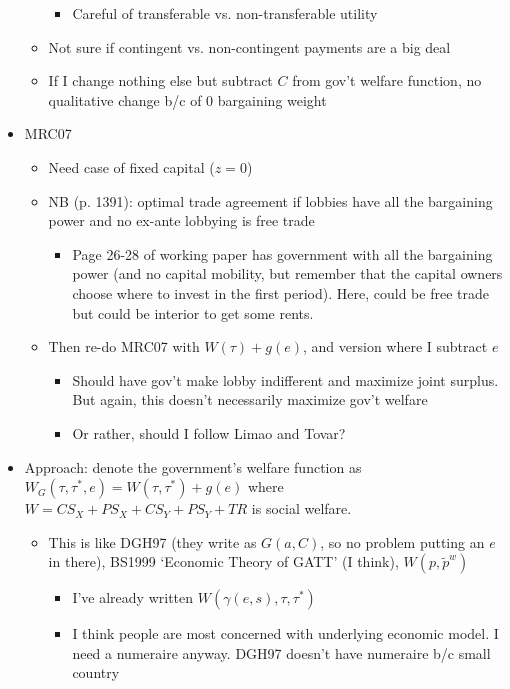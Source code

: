 \documentclass[12pt]{article}
\newcommand{\ga}{\gamma}
\begin{document}
\begin{itemize}
\begin{itemize}
\begin{itemize}
						\item Careful of transferable vs. non-transferable utility
					\end{itemize}
				\item Not sure if contingent vs. non-contingent payments are a big deal
				\item If I change nothing else but subtract $C$ from gov't welfare function, no qualitative change b/c of 0 bargaining weight
			\end{itemize}
		\item MRC07
			\begin{itemize}
				\item Need case of fixed capital ($z=0$)
				\item NB (p. 1391): optimal trade agreement if lobbies have all the bargaining power and no ex-ante lobbying is free trade
					\begin{itemize}
						\item Page 26-28 of working paper has government with all the bargaining power (and no capital mobility, but remember that the capital owners choose where to invest in the first period). Here, could be free trade but could be interior to get some rents.
					\end{itemize}
				\item Then re-do MRC07 with $W(\tau) + g(e)$, and version where I subtract $e$
					\begin{itemize}
						\item Should have gov't make lobby indifferent and maximize joint surplus. But again, this doesn't necessarily maximize gov't welfare
						\item Or rather, should I follow Limao and Tovar?
					\end{itemize}
			\end{itemize}
		\item Approach: denote the government's welfare function as $W_G(\tau,\tau^*,e) = W(\tau,\tau^*) + g(e)$ where $W = CS_X + PS_X + CS_Y + PS_Y +TR$ is social welfare.
			\begin{itemize}
				\item This is like DGH97 (they write as $G(a,C)$, so no problem putting an $e$ in there), BS1999 `Economic Theory of GATT' (I think), $W(p,\tilde{p}^w)$
					\begin{itemize}
						\item I've already written $W(\ga(e,s),\tau,\tau^*)$
						\item I think people are most concerned with underlying economic model. I need a numeraire anyway. DGH97 doesn't have numeraire b/c small country

\end{itemize}
\end{itemize}
\end{itemize}
\end{document}
